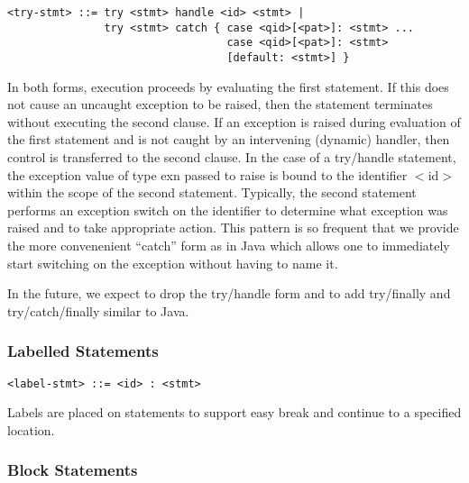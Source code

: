 \documentclass[titlepage,10pt]{article}
\begin{document}
\begin{verbatim}
<try-stmt> ::= try <stmt> handle <id> <stmt> | 
               try <stmt> catch { case <qid>[<pat>]: <stmt> ...
                                  case <qid>[<pat>]: <stmt>
                                  [default: <stmt>] }
\end{verbatim}

In both forms, execution proceeds by evaluating the first statement.  If
this does not cause an uncaught exception to be raised, then the
statement terminates without executing the second clause.  If an
exception is raised during evaluation of the first statement and is not
caught by an intervening (dynamic) handler, then control is transferred
to the second clause.  In the case of a try/handle statement, the
exception value of type exn passed to raise is bound to the identifier
$<$id$>$ within the scope of the second statement.   Typically, the second
statement performs an exception switch on the identifier to determine
what exception was raised and to take appropriate action.  This pattern
is so frequent that we provide the more convenenient ``catch'' form as
in Java which allows one to immediately start switching on the exception
without having to name it.

In the future, we expect to drop the try/handle form and to add
try/finally and try/catch/finally similar to Java.


\subsubsection{Labelled Statements}


\begin{verbatim}
<label-stmt> ::= <id> : <stmt>
\end{verbatim}

Labels are placed on statements to support easy break and continue to a
specified location.


\subsubsection{Block Statements}

\end{document}
